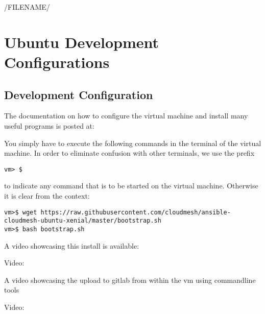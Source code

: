 /FILENAME/
\section{Ubuntu Development Configurations}

\subsection{Development Configuration}

The documentation on how to configure the virtual machine and install many useful programs is posted at:


You simply have to execute the following commands in the terminal of the virtual machine. In order to eliminate confusion with other terminals, we use the prefix 
\begin{verbatim}
vm> $ 
\end{verbatim}

to indicate any command that is to be started on the virtual machine. Otherwise it is clear from the context:

\begin{lstlisting}
vm>$ wget https://raw.githubusercontent.com/cloudmesh/ansible-cloudmesh-ubuntu-xenial/master/bootstrap.sh
vm>$ bash bootstrap.sh
\end{lstlisting} 

A video showcasing this install is available:

Video: 

A video showcasing the upload to gitlab from within the vm using commandline tools

Video: 
